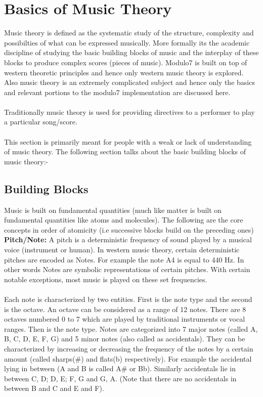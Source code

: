 \chapter{Basics of Music Theory}
\label{sec:music theory}

\noindent Music theory is defined as the systematic study of the structure, complexity and possibilties of what can be expressed musically. More formally its the academic discipline of studying the basic building blocks of music and the interplay of these blocks to produce complex scores (pieces of music). Modulo7 is built on top of western theoretic principles and hence only western music theory is explored. Also music theory is an extremely complicated subject and hence only the basics and relevant portions to the modulo7 implementation are discussed here. \\\\
Traditionally music theory is used for providing directives to a performer to play a particular song/score. \\\\
This section is primarily meant for people with a weak or lack of understanding of music theory. 
The following section talks about the basic building blocks of music theory:-
\section{Building Blocks}

\noindent Music is built on fundamental quantities (much like matter is built on fundamental quantities like atoms and molecules). The following are the core concepts in order of atomicity (i.e successive blocks build on the preceding ones)\\

\noindent \textbf{Pitch/Note: } A pitch is a deterministic frequency of sound played by a musical voice (instrument or human). In western music theory, certain deterministic pitches are encoded as Notes. For example the note A4 is equal to 440 Hz. In other words Notes are symbolic representations of certain pitches. With certain notable exceptions, most music is played on these set frequencies. \\\\
Each note is characterized by two entities. First is the note type and the second is the octave. An octave can be considered as a range of 12 notes. There are 8 octaves numbered 0 to 7 which are played by traditional instruments or vocal ranges. Then is the note type. Notes are categorized into 7 major notes (called A, B, C, D, E, F, G) and 5 minor notes (also called as accidentals). They can be characterized by increasing or decreasing the frequency of the notes by a certain amount (called sharps(\#) and flats(b) respectively). For example the accidental lying in between (A and B is called A\# or Bb). Similarly accidentals lie in between C, D; D, E; F, G and G, A. (Note that there are no accidentals in between B and C and E and F). \\

